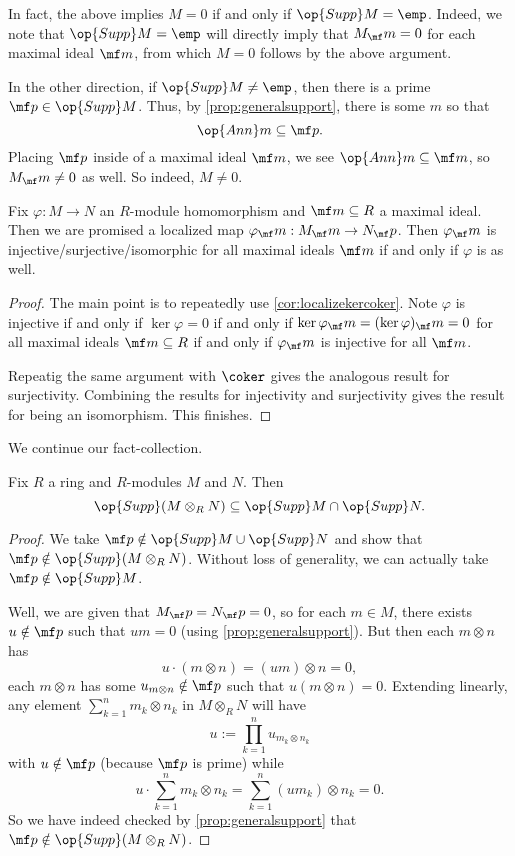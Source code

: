 \begin{remark}
	In fact, the above implies $M=0$ if and only if $\op{Supp}M=\emp$. Indeed, we note that $\op{Supp}M=\emp$ will directly imply that $M_\mf m=0$ for each maximal ideal $\mf m$, from which $M=0$ follows by the above argument.
	
	In the other direction, if $\op{Supp}M\ne\emp$, then there is a prime $\mf p\in\op{Supp}M$. Thus, by \autoref{prop:generalsupport}, there is some $m$ so that
	\[\op{Ann}m\subseteq\mf p.\]
	Placing $\mf p$ inside of a maximal ideal $\mf m$, we see $\op{Ann}m\subseteq\mf m$, so $M_\mf m\ne0$ as well. So indeed, $M\ne0$.
\end{remark}
\begin{corollary}
	Fix $\varphi:M\to N$ an $R$-module homomorphism and $\mf m\subseteq R$ a maximal ideal. Then we are promised a localized map $\varphi_\mf m:M_\mf m\to N_\mf p$. Then $\varphi_\mf m$ is injective/surjective/isomorphic for all maximal ideals $\mf m$ if and only if $\varphi$ is as well.
\end{corollary}
\begin{proof}
	The main point is to repeatedly use \autoref{cor:localizekercoker}. Note $\varphi$ is injective if and only if $\ker\varphi=0$ if and only if $\ker\varphi_\mf m=(\ker\varphi)_\mf m=0$ for all maximal ideals $\mf m\subseteq R$ if and only if $\varphi_\mf m$ is injective for all $\mf m$.
	
	Repeatig the same argument with $\coker$ gives the analogous result for surjectivity. Combining the results for injectivity and surjectivity gives the result for being an isomorphism. This finishes.
\end{proof}
We continue our fact-collection.
\begin{proposition}
	Fix $R$ a ring and $R$-modules $M$ and $N$. Then
	\[\op{Supp}(M\otimes_RN)\subseteq\op{Supp}M\cap\op{Supp}N.\]
\end{proposition}
\begin{proof}
	We take $\mf p\notin\op{Supp}M\cup\op{Supp}N$ and show that $\mf p\notin\op{Supp}(M\otimes_RN)$. Without loss of generality, we can actually take $\mf p\notin\op{Supp}M$.

	Well, we are given that $M_\mf p=N_\mf p=0$, so for each $m\in M$, there exists $u\notin\mf p$ such that $um=0$ (using \autoref{prop:generalsupport}). But then each $m\otimes n$ has
	\[u\cdot(m\otimes n)=(um)\otimes n=0,\]
	each $m\otimes n$ has some $u_{m\otimes n}\notin\mf p$ such that $u(m\otimes n)=0$. Extending linearly, any element $\sum_{k=1}^nm_k\otimes n_k$ in $M\otimes_RN$ will have
	\[u:=\prod_{k=1}^nu_{m_k\otimes n_k}\]
	with $u\notin\mf p$ (because $\mf p$ is prime) while
	\[u\cdot\sum_{k=1}^nm_k\otimes n_k=\sum_{k=1}^n(um_k)\otimes n_k=0.\]
	So we have indeed checked by \autoref{prop:generalsupport} that $\mf p\notin\op{Supp}(M\otimes_RN)$.
\end{proof}
